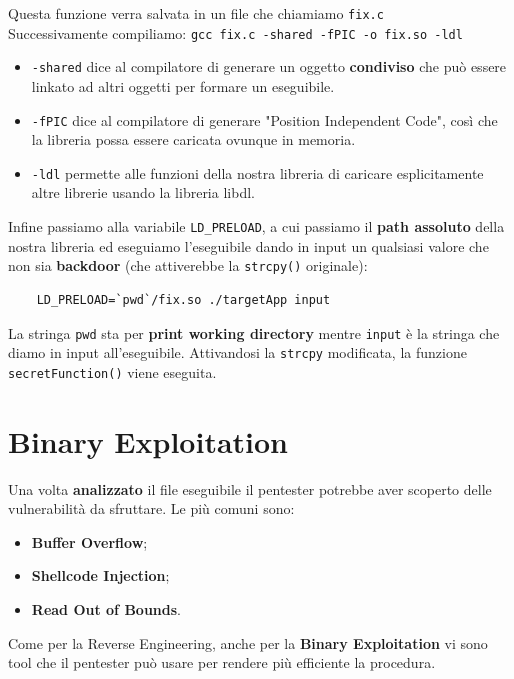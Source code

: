 \documentclass{article}
\begin{document}
Questa funzione verra salvata in un file che chiamiamo \verb|fix.c|\\
Successivamente compiliamo: \verb|gcc fix.c -shared -fPIC -o fix.so -ldl|

\begin{itemize}
	\item \verb|-shared| dice al compilatore di generare un oggetto \textbf{condiviso} che può essere linkato ad altri oggetti per formare un eseguibile.
	
	\item \verb|-fPIC| dice al compilatore di generare "Position Independent Code", così che la libreria possa essere caricata ovunque in memoria.
	
	\item \verb|-ldl| permette alle funzioni della nostra libreria di caricare esplicitamente altre librerie usando la libreria libdl.
\end{itemize}

Infine passiamo alla variabile \verb|LD_PRELOAD|, a cui passiamo il \textbf{path assoluto} della nostra libreria ed eseguiamo l'eseguibile dando in input un qualsiasi valore che non sia \textbf{backdoor} (che attiverebbe la \verb|strcpy()| originale):
\begin{verbatim}
	LD_PRELOAD=`pwd`/fix.so ./targetApp input
\end{verbatim}

La stringa \verb|pwd| sta per \textbf{print working directory} mentre \verb|input| è la stringa che diamo in input all'eseguibile. Attivandosi la \verb|strcpy| modificata, la funzione \verb|secretFunction()| viene eseguita.


\section{Binary Exploitation}
Una volta \textbf{analizzato} il file eseguibile il pentester potrebbe aver scoperto delle vulnerabilità da sfruttare. Le più comuni sono:
\begin{itemize}
	\item \textbf{Buffer Overflow};
	\item \textbf{Shellcode Injection};
	\item \textbf{Read Out of Bounds}.
\end{itemize}

Come per la Reverse Engineering, anche per la \textbf{Binary Exploitation} vi sono tool che il pentester può usare per rendere più efficiente la procedura.
\end{document}

